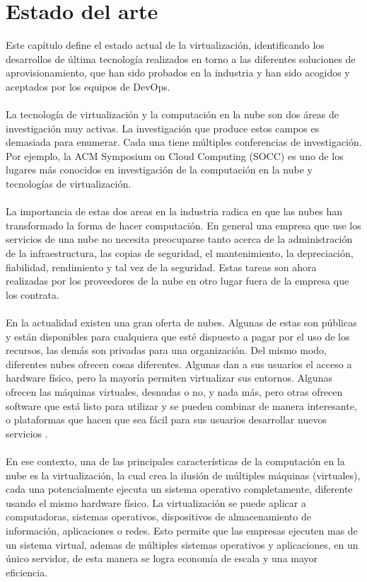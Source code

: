 
\chapter{Estado del arte}
\label{aprmaqvir}

Este capítulo define el estado actual de la virtualización, identificando los desarrollos de última tecnología realizados en torno a las diferentes soluciones de aprovisionamiento, que han sido probados en la industria y han sido acogidos y aceptados por los equipos de DevOps.\\
\\
La tecnología de virtualización y la computación en la nube son dos áreas de investigación muy activas. La investigación que produce estos campos es demasiada para enumerar. Cada una tiene múltiples conferencias de investigación. Por ejemplo, la ACM Symposium on Cloud Computing (SOCC) \cite{socc15} es uno de los lugares más conocidos en investigación de la computación en la nube y tecnologías de virtualización.\\
\\
La importancia de estas dos areas en la industria radica en que las nubes han transformado la forma de hacer computación. En general una empresa que use los servicios de una nube no necesita preocuparse tanto acerca de la administración de la infraestructura, las copias de seguridad, el mantenimiento, la depreciación, fiabilidad, rendimiento y tal vez de la seguridad. Estas tareas son ahora realizadas por los proveedores de la nube en otro lugar fuera de la empresa que los contrata.\\
\\
En la actualidad existen una gran oferta de nubes. Algunas de estas son públicas y están disponibles para cualquiera que esté dispuesto a pagar por el uso de los recursos, las demás son privadas para una organización. Del mismo modo, diferentes nubes ofrecen cosas diferentes. Algunas dan a sus usuarios el acceso a hardware físico, pero la mayoría permiten virtualizar sus entornos. Algunas ofrecen  las máquinas virtuales, desnudas o no, y nada más, pero otras ofrecen software que está listo para
utilizar y se pueden combinar de manera interesante, o plataformas que hacen que sea fácil para
sus usuarios desarrollar nuevos servicios \cite{tanembaum14}.\\
\\
En ese contexto, una de las principales características de la computación en la nube es la virtualización, la cual crea la ilusión de múltiples máquinas (virtuales), cada una potencialmente ejecuta un sistema operativo completamente, diferente usando el mismo hardware físico. La virtualización se puede aplicar a computadoras, sistemas operativos, dispositivos de almacenamiento de información, aplicaciones o redes. Esto permite que las empresas ejecuten mas de un sistema virtual, ademas de múltiples sistemas operativos y aplicaciones, en un único servidor, de esta manera se logra economía de escala y una mayor eficiencia.\\
\\
